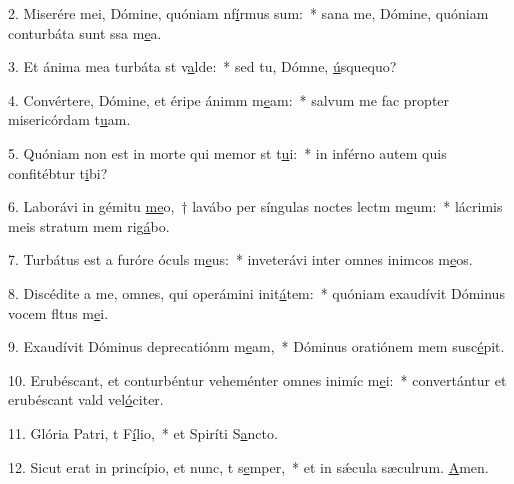 2. Miserére mei, Dómine, quóniam nf\uline{í}rmus sum:~* sana me, Dómine, quóniam conturbáta sunt ssa m\uline{e}a.\par 
3. Et ánima mea turbáta st v\uline{a}lde:~* sed tu, Dómne, \uline{ú}squequo?\par 
4. Convértere, Dómine, et éripe ánimm m\uline{e}am:~* salvum me fac propter misericórdam t\uline{u}am.\par 
5. Quóniam non est in morte qui memor st t\uline{u}i:~* in inférno autem quis confitébtur t\uline{i}bi?\par 
6. Laborávi in gémitu \uline{me}o,~† lavábo per síngulas noctes lectm m\uline{e}um:~* lácrimis meis stratum mem rig\uline{á}bo.\par 
7. Turbátus est a furóre óculs m\uline{e}us:~* inveterávi inter omnes inimcos m\uline{e}os.\par 
8. Discédite a me, omnes, qui operámini init\uline{á}tem:~* quóniam exaudívit Dóminus vocem fltus m\uline{e}i.\par 
9. Exaudívit Dóminus deprecatiónm m\uline{e}am,~* Dóminus oratiónem mem susc\uline{é}pit.\par 
10. Erubéscant, et conturbéntur veheménter omnes inimíc m\uline{e}i:~* convertántur et erubéscant vald vel\uline{ó}citer.\par 
11. Glória Patri, t F\uline{í}lio,~* et Spiríti S\uline{a}ncto.\par 
12. Sicut erat in princípio, et nunc, t s\uline{e}mper,~* et in sǽcula sæculrum. \uline{A}men.\par 
